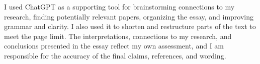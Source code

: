 \documentclass[11pt,a4paper]{article}
\begin{document}
I used ChatGPT as a supporting tool for brainstorming connections to my research, finding potentially relevant papers, organizing the essay, and improving grammar and clarity. I also used it to shorten and restructure parts of the text to meet the page limit. The interpretations, connections to my research, and conclusions presented in the essay reflect my own assessment, and I am responsible for the accuracy of the final claims, references, and wording.



\printbibliography
\end{document}
